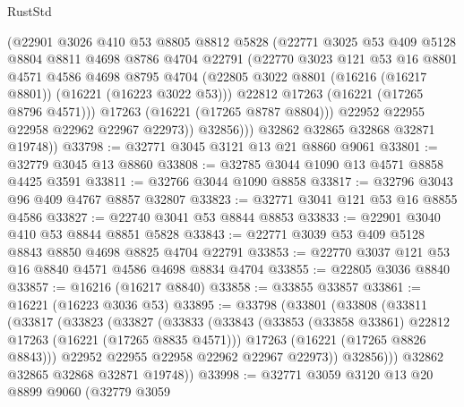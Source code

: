 \begin{lexlean}{RustStd}
\begin{coremodule}
                (@22901
                  @3026
                  @410
                  @53
                  @8805
                  @8812
                  @5828
                  (@22771
                    @3025
                    @53
                    @409
                    @5128
                    @8804
                    @8811
                    @4698
                    @8786
                    @4704
                    @22791
                    (@22770
                      @3023
                      @121
                      @53
                      @16
                      @8801
                      @4571
                      @4586
                      @4698
                      @8795
                      @4704
                      (@22805 @3022 @8801 (@16216 (@16217 @8801)) (@16221 (@16223 @3022 @53)))
                      @22812
                      @17263
                      (@16221 (@17265 @8796 @4571)))
                    @17263
                    (@16221 (@17265 @8787 @8804)))
                  @22952
                  @22955
                  @22958
                  @22962
                  @22967
                  @22973))
              @32856)))
        @32862
        @32865
        @32868
        @32871
        @19748))
@33798 := @32771 @3045 @3121 @13 @21 @8860 @9061
@33801 := @32779 @3045 @13 @8860
@33808 := @32785 @3044 @1090 @13 @4571 @8858 @4425 @3591
@33811 := @32766 @3044 @1090 @8858
@33817 := @32796 @3043 @96 @409 @4767 @8857 @32807
@33823 := @32771 @3041 @121 @53 @16 @8855 @4586
@33827 := @22740 @3041 @53 @8844 @8853
@33833 := @22901 @3040 @410 @53 @8844 @8851 @5828
@33843 := @22771 @3039 @53 @409 @5128 @8843 @8850 @4698 @8825 @4704 @22791
@33853 := @22770 @3037 @121 @53 @16 @8840 @4571 @4586 @4698 @8834 @4704
@33855 := @22805 @3036 @8840
@33857 := @16216 (@16217 @8840)
@33858 := @33855 @33857
@33861 := @16221 (@16223 @3036 @53)
@33895 := @33798
    (@33801
      (@33808
        (@33811
          (@33817
            (@33823
              (@33827
                (@33833
                  (@33843
                    (@33853 (@33858 @33861) @22812 @17263 (@16221 (@17265 @8835 @4571)))
                    @17263
                    (@16221 (@17265 @8826 @8843)))
                  @22952
                  @22955
                  @22958
                  @22962
                  @22967
                  @22973))
              @32856)))
        @32862
        @32865
        @32868
        @32871
        @19748))
@33998 := @32771
    @3059
    @3120
    @13
    @20
    @8899
    @9060
    (@32779
      @3059

\end{coremodule}
\end{lexlean}
